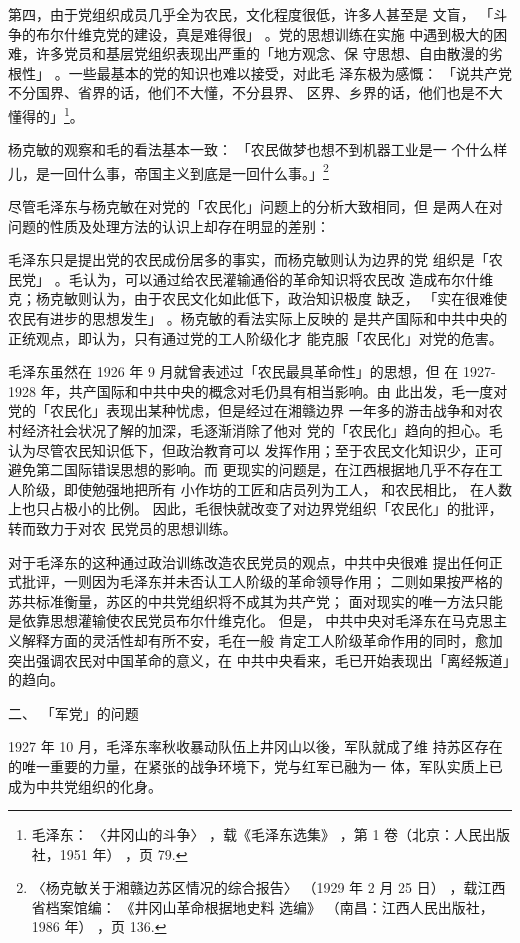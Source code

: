 第四，由于党组织成员几乎全为农民，文化程度很低，许多人甚至是
文盲，
「斗争的布尔什维克党的建设，真是难得很」
。党的思想训练在实施
中遇到极大的困难，许多党员和基层党组织表现出严重的「地方观念、保
守思想、自由散漫的劣根性」
。一些最基本的党的知识也难以接受，对此毛
泽东极为感慨：
「说共产党不分国界、省界的话，他们不大懂，不分县界、
区界、乡界的话，他们也是不大懂得的」\footnote{ 毛泽东：
〈井冈山的斗争〉
，载《毛泽东选集》
，第 1 卷（北京：人民出版社，1951 年）
，页 79.}。
 
杨克敏的观察和毛的看法基本一致： 「农民做梦也想不到机器工业是一
个什么样儿，是一回什么事，帝国主义到底是一回什么事。」\footnote{ 〈杨克敏关于湘赣边苏区情况的综合报告〉
（1929 年 2 月 25 日）
，载江西省档案馆编：
《井冈山革命根据地史料
选编》
（南昌：江西人民出版社，1986 年）
，页 136.}

尽管毛泽东与杨克敏在对党的「农民化」问题上的分析大致相同，但
是两人在对问题的性质及处理方法的认识上却存在明显的差别：

毛泽东只是提出党的农民成份居多的事实，而杨克敏则认为边界的党
组织是「农民党」
。毛认为，可以通过给农民灌输通俗的革命知识将农民改
造成布尔什维克；杨克敏则认为，由于农民文化如此低下，政治知识极度
缺乏，
「实在很难使农民有进步的思想发生」
。杨克敏的看法实际上反映的
是共产国际和中共中央的正统观点，即认为，只有通过党的工人阶级化才
能克服「农民化」对党的危害。

毛泽东虽然在 1926 年 9 月就曾表述过「农民最具革命性」的思想，但
在 1927-1928 年，共产国际和中共中央的概念对毛仍具有相当影响。由
此出发，毛一度对党的「农民化」表现出某种忧虑，但是经过在湘赣边界
一年多的游击战争和对农村经济社会状况了解的加深，毛逐渐消除了他对
党的「农民化」趋向的担心。毛认为尽管农民知识低下，但政治教育可以
发挥作用；至于农民文化知识少，正可避免第二国际错误思想的影响。而
更现实的问题是，在江西根据地几乎不存在工人阶级，即使勉强地把所有
小作坊的工匠和店员列为工人，
和农民相比，
在人数上也只占极小的比例。
因此，毛很快就改变了对边界党组织「农民化」的批评，转而致力于对农
民党员的思想训练。

对于毛泽东的这种通过政治训练改造农民党员的观点，中共中央很难
提出任何正式批评，一则因为毛泽东并未否认工人阶级的革命领导作用；
二则如果按严格的苏共标准衡量，苏区的中共党组织将不成其为共产党；
面对现实的唯一方法只能是依靠思想灌输使农民党员布尔什维克化。
但是，
中共中央对毛泽东在马克思主义解释方面的灵活性却有所不安，毛在一般
肯定工人阶级革命作用的同时，愈加突出强调农民对中国革命的意义，在
中共中央看来，毛已开始表现出「离经叛道」的趋向。
 
二、
「军党」的问题

1927 年 10 月，毛泽东率秋收暴动队伍上井冈山以後，军队就成了维
持苏区存在的唯一重要的力量，在紧张的战争环境下，党与红军已融为一
体，军队实质上已成为中共党组织的化身。

